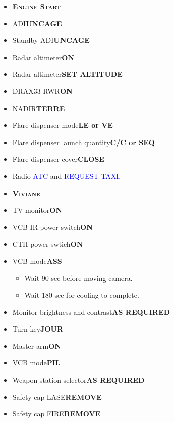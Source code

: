 \documentclass[a4paper,12pt,dvipsnames]{letter}
\newcommand{\radio}[1]{\textcolor{blue}{#1}}
\newcommand{\button}[1]{\textbf{#1}}
\newcommand{\myHead}[1]{{\LARGE\textsc{\textbf{#1}}}}
\begin{document}
{\begin{itemize}
\end{itemize}
\newpage
\begin{itemize}
 \item[] \myHead{Engine Start}
 \item ADI\dotfill\button{UNCAGE}
 \item Standby ADI\dotfill\button{UNCAGE} 
 \item Radar altimeter\dotfill\button{ON}
 \item Radar altimeter\dotfill\button{SET ALTITUDE}
 \item DRAX33 RWR\dotfill\button{ON}
 \item NADIR\dotfill\button{TERRE}
 \item Flare dispenser mode\dotfill\button{LE or VE}
 \item Flare dispenser launch quantity\dotfill\button{C/C or SEQ}
 \item Flare dispenser cover\dotfill\button{CLOSE}
 \item Radio \radio{ATC} and \radio{REQUEST TAXI}.
\end{itemize}
\newpage
\begin{itemize} 
 \item[] \myHead{Viviane}
 \item TV monitor\dotfill\button{ON}
 \item VCB IR power switch\dotfill\button{ON}
 \item CTH power swtich\dotfill\button{ON}
 \item VCB mode\dotfill\button{ASS}
 \begin{itemize}
  \item Wait 90 sec before moving camera.
  \item Wait 180 sec for cooling to complete.
 \end{itemize}
 \item Monitor brightness and contrast\dotfill\button{AS REQUIRED}
 \item Turn key\dotfill\button{JOUR}
 \item Master arm\dotfill\button{ON}
 \item VCB mode\dotfill\button{PIL}
 \item Weapon station selector\dotfill\button{AS REQUIRED}
 \item Safety cap LASE\dotfill\button{REMOVE}
 \item Safety cap FIRE\dotfill\button{REMOVE}  
\end{itemize}
}
\end{document}
